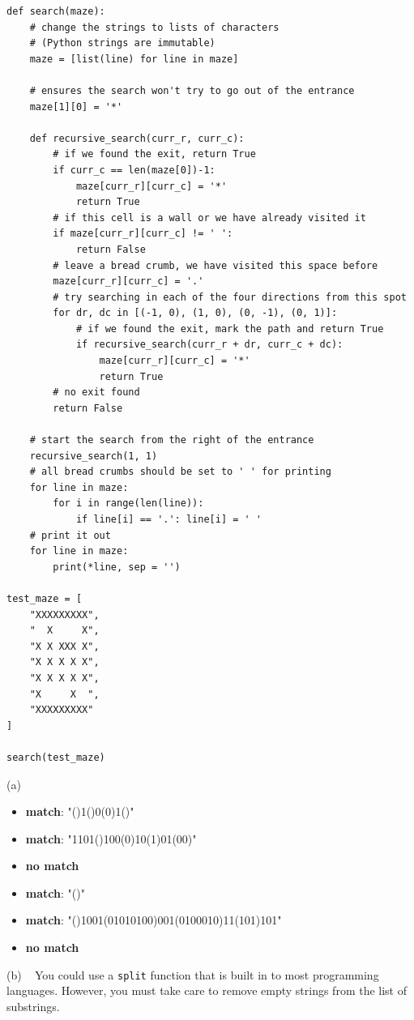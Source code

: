 \documentclass[12pt]{article}
\begin{document}
{\footnotesize\begin{verbatim}
def search(maze):
    # change the strings to lists of characters
    # (Python strings are immutable)
    maze = [list(line) for line in maze]

    # ensures the search won't try to go out of the entrance
    maze[1][0] = '*'

    def recursive_search(curr_r, curr_c):
        # if we found the exit, return True
        if curr_c == len(maze[0])-1:
            maze[curr_r][curr_c] = '*'
            return True
        # if this cell is a wall or we have already visited it
        if maze[curr_r][curr_c] != ' ':
            return False
        # leave a bread crumb, we have visited this space before
        maze[curr_r][curr_c] = '.'
        # try searching in each of the four directions from this spot
        for dr, dc in [(-1, 0), (1, 0), (0, -1), (0, 1)]:
            # if we found the exit, mark the path and return True
            if recursive_search(curr_r + dr, curr_c + dc):
                maze[curr_r][curr_c] = '*'
                return True
        # no exit found
        return False

    # start the search from the right of the entrance
    recursive_search(1, 1)
    # all bread crumbs should be set to ' ' for printing
    for line in maze:
        for i in range(len(line)):
            if line[i] == '.': line[i] = ' '
    # print it out
    for line in maze:
        print(*line, sep = '')

test_maze = [
    "XXXXXXXXX",
    "  X     X",
    "X X XXX X",
    "X X X X X",
    "X X X X X",
    "X     X  ",
    "XXXXXXXXX"
]

search(test_maze)
\end{verbatim}}
\newpage
{}(a)

\begin{itemize}
\item {\bf match}: "()1()0(0)1()"
\item {\bf match}: "1101()100(0)10(1)01(00)"
\item {\bf no match}
\item {\bf match}: "()"
\item {\bf match}: "()1001(01010100)001(0100010)11(101)101"
\item {\bf no match}
\end{itemize}
\vfill

(b) ~
You could use a \texttt{split} function that is built in to most programming languages. However, you must take care to remove empty strings from the list of substrings.
\end{document}

